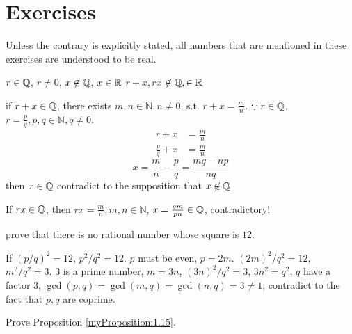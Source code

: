 \section{Exercises}

Unless the contrary is explicitly stated, all numbers that are mentioned in these exercises are understood to be real.

\begin{myExercise}
    \label{ex:1.1}
    $r \in {\protect\mathbb Q} $, $r \neq 0$, $x \not\in {\protect\mathbb Q} $, $x \in {\protect\mathbb R}$
    $r+x, rx$ $\not\in {\protect\mathbb Q} , \in {\protect\mathbb R}$
\end{myExercise}


\mySolve

if $r+x \in {\protect\mathbb Q} $, there exists $m, n \in \mathbb{N}, n \neq 0$, s.t. $r+x = \frac{m}{n}$.
    $\because r\in {\protect\mathbb Q} $, $r = \frac{p}{q}, p,q \in \mathbb{N}, q \neq 0$.
    \begin{align*}
        r + x &= \frac{m}{n}\\
        \frac{p}{q} + x &= \frac{m}{n}
    \end{align*}
    \begin{equation*}
        x = \frac{m}{n} - \frac{p}{q} = \frac{mq-np}{nq}
    \end{equation*}
    then $x \in {\protect\mathbb Q} $ contradict to the supposition that $x \not\in {\protect\mathbb Q} $

    If $rx \in {\protect\mathbb Q} $, then $rx = \frac{m}{n}, m,n\in \mathbb{N}$, $x = \frac{qm}{pn} \in {\protect\mathbb Q} $, contradictory!



\begin{myExercise}
    \label{ex:1.2}
    prove that there is no rational number whose square is $12$. 
\end{myExercise}


\mySolve

If $\left(p/q\right)^2 = 12$, $p^2/q^2 = 12$. $p$ must be even, $p = 2m$.
    $(2m)^2/q^2 = 12$, $m^2/q^2=3$. 
    $3$ is a prime number, $m = 3n$, $(3n)^2/q^2 = 3$, $3n^2 = q^2$, $q$ have a factor $3$,
    $\gcd(p,q) = \gcd(m,q) = \gcd(n,q) = 3 \neq 1$, contradict to the fact that $p,q$ are coprime.


\begin{myExercise}
    \label{ex:1.3}
    Prove Proposition \ref{myProposition:1.15}.
\end{myExercise}


\mySolve

